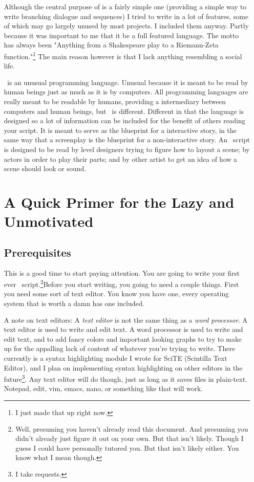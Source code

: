 Although the central purpose of \SSquared is a fairly simple one (providing a simple way to write branching dialogue and sequences) I tried to write in a lot of features, some of which may go largely unused by most projects.  I included them anyway.  Partly because it was important to me that it be a full featured language.  The motto has always been "Anything from a Shakespeare play to a Riemann-Zeta function."\footnote{I just made that up right now.}  The main reason however is that I lack anything resembling a social life.

\SSquared\ is an unusual programming language.  Unusual because it is meant to be read by human beings just as much as it is by computers.  All programming languages are really meant to be readable by humans, providing a intermediary between computers and human beings, but \SSquared\ is different.  Different in that the language is designed so a lot of information can be included for the benefit of others reading your script.  It is meant to serve as the blueprint for a interactive story, in the same way that a screenplay is the blueprint for a non-interactive story.  An \SSquared\ script is designed to be read by level designers trying to figure how to layout a scene; by actors in order to play their parts; and by other artist to get an idea of how a scene should look or sound.

\section{A Quick Primer for the Lazy and Unmotivated}

\subsection{Prerequisites}

This is a good time to start paying attention.  You are going to write your first ever \SSquared\ script.\footnote{Well, presuming you haven't already read this document.  And presuming you didn't already just figure it out on your own.  But that isn't likely.  Though I guess I could have personally tutored you.  But that isn't likely either.  You know what I mean though.}Before you start writing, you going to need a couple things.  First you need some sort of text editor.  You know you have one, every operating system that is worth a damn has one included.  

A note on text editors: A \emph{text editor} is not the same thing as a \emph{word processor}.  A text editor is used to write and edit text.  A word processor is used to write and edit text, and to add fancy colors and important looking graphs to try to make up for the appalling lack of content of whatever you're trying to write.  There currently is a syntax highlighting module I wrote for SciTE (Scintilla Text Editor), and I plan on implementing syntax highlighting on other editors in the future\footnote{I take requests.}.  Any text editor will do though, just as long as it saves files in plain-text.  Notepad, edit, vim, emacs, nano, or something like that will work.

